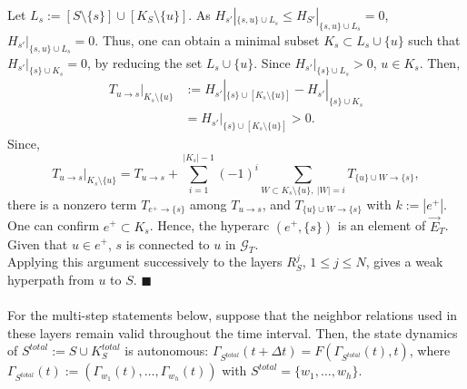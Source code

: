 \documentclass{comnet}%
\begin{document}
Let $L_{s} := [S \setminus \{ s \}] \cup [K_{S} \setminus \{ u \}]$. As $H_{s'}|_{\{s, u\} \cup L_{s}} \leqslant H_{S'}|_{\{s, u\} \cup L_{s}} = 0$, $H_{s'}|_{\{s, u\} \cup L_{s}} = 0$. Thus, one can obtain a minimal subset $K_{s} \subset L_{s} \cup \{ u\}$ such that $H_{s'}|_{\{s\} \cup K_{s}} = 0$, by reducing the set $L_{s} \cup \{ u\}$. Since $H_{s'}|_{\{s\} \cup L_{s}} > 0$, $u \in K_{s}$. Then,
\begin{equation}\begin{aligned}
		T_{u \to s}|_{K_{s} \setminus \{ u \}} &:= H_{s'}|_{\{s\} \cup [K_{s} \setminus \{ u \}]} - H_{s'}|_{\{s\} \cup K_{s}}\\
		&= H_{s'}|_{\{s\} \cup [K_{s} \setminus \{ u \}]} > 0.
\end{aligned}\end{equation}
Since,
\begin{equation}
 T_{u\to s}|_{K_s\setminus\{u\}}
 =T_{u\to s}+\sum_{i=1}^{|K_s|-1}(-1)^i\sum_{W\subset K_s\setminus\{u\},\ |W|=i}T_{\{u\}\cup W\to\{s\}},
\end{equation}
there is a nonzero term $T_{e^{+} \to \{s\}}$ among $T_{u \to s}$, and $T_{\{ u \} \cup W \to \{s\}}$ with $k := |e^{+}|$. One can confirm $e^{+} \subset K_{s}$. Hence, the hyperarc $(e^{+}, \{ s\})$ is an element of $\overrightarrow{E}_{T}$. Given that $u \in e^{+}$, $s$ is connected to $u$ in $\mathcal{G}_{T}$.\\
Applying this argument successively to the layers $R^j_S$, $1\leqslant j\leqslant N$, gives a weak hyperpath from $u$ to $S$. $\blacksquare$\\ \quad \\

For the multi-step statements below, suppose that the neighbor relations used in these layers remain valid throughout the time interval. Then, the state dynamics of $S^{total} := S \cup K^{total}_{S}$ is autonomous: $\Gamma_{S^{total}}(t + \Delta t) = F(\Gamma_{S^{total}}(t) ,t)$, where $\Gamma_{S^{total}}(t) := (\Gamma_{w_{1}}(t), \dots, \Gamma_{w_{h}}(t))$ with $S^{total} = \{ w_{1}, \dots, w_{h}\}$.
\end{document}
